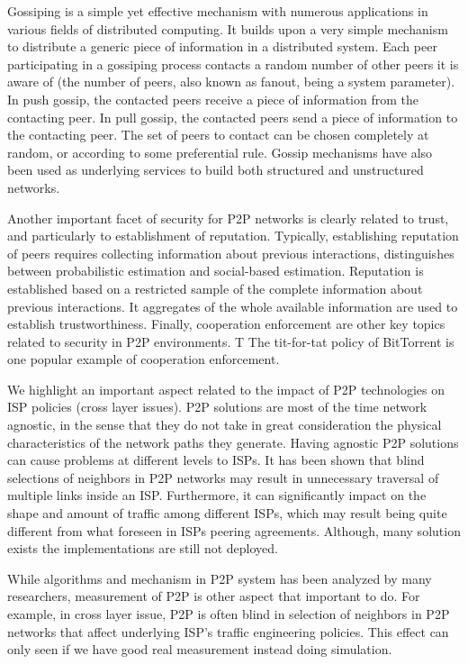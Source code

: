 Gossiping is a simple yet effective mechanism with numerous applications in various fields of distributed computing. 
It builds upon a very simple mechanism to distribute a generic piece of information in a distributed system. 
Each peer participating in a gossiping process contacts a random number of other peers it is aware of (the number of peers, also known as fanout, being a system parameter). 
In push gossip, the contacted peers receive a piece of information from the contacting peer. 
In pull gossip, the contacted peers send a piece of information to the contacting peer. 
The set of peers to contact can be chosen completely at random, or according to some preferential rule.
Gossip mechanisms have also been used as underlying services to build both structured and unstructured networks. 

Another important facet of security for P2P networks is clearly related to trust, and particularly to establishment of reputation. 
Typically, establishing reputation of peers requires collecting information about previous interactions, distinguishes between probabilistic estimation and social-based estimation. 
Reputation is established based on a restricted sample of the complete information about previous interactions. 
It aggregates of the whole available information are used to establish trustworthiness.
Finally, cooperation enforcement are other key topics related to security in P2P environments. T
The tit-for-tat policy of BitTorrent is one popular example of cooperation enforcement.

We highlight an important aspect related to the impact of P2P technologies on ISP policies (cross layer issues). 
P2P solutions are most of the time network agnostic, in the sense that they do not take in great consideration the physical characteristics of the network paths they generate. 
Having agnostic P2P solutions can cause problems at different levels to ISPs. 
It has been shown that blind selections of neighbors in P2P networks may result in unnecessary traversal of multiple links inside an ISP. 
Furthermore, it can significantly impact on the shape and amount of traffic among different ISPs, which may result being quite different from what foreseen in ISPs peering agreements.
Although, many solution exists the implementations are still not deployed. 

While algorithms and mechanism in P2P system has been analyzed by many researchers, measurement of P2P is other aspect that important to do. 
For example, in cross layer issue, P2P is often blind in selection of neighbors in P2P networks that affect underlying ISP's traffic engineering policies.  
This effect can only seen if we have good real measurement instead doing simulation.






